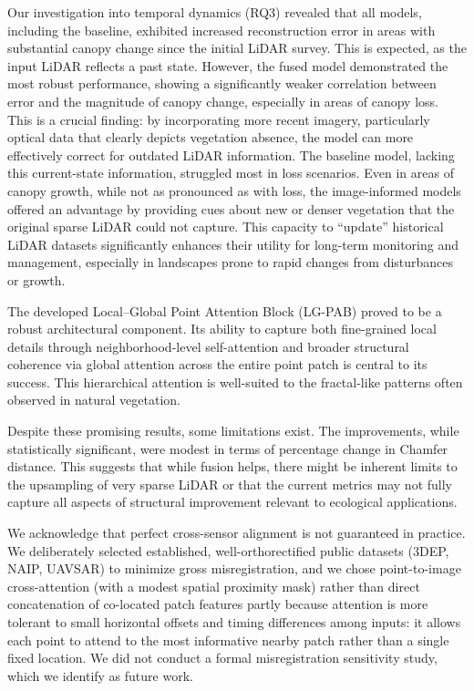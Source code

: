 \documentclass[12pt]{report}
\begin{document}
Our investigation into temporal dynamics (RQ3) revealed that all models, including the baseline, exhibited increased reconstruction error in areas with substantial canopy change since the initial LiDAR survey. This is expected, as the input LiDAR reflects a past state. However, the fused model demonstrated the most robust performance, showing a significantly weaker correlation between error and the magnitude of canopy change, especially in areas of canopy loss. This is a crucial finding: by incorporating more recent imagery, particularly optical data that clearly depicts vegetation absence, the model can more effectively correct for outdated LiDAR information. The baseline model, lacking this current-state information, struggled most in loss scenarios. Even in areas of canopy growth, while not as pronounced as with loss, the image-informed models offered an advantage by providing cues about new or denser vegetation that the original sparse LiDAR could not capture. This capacity to ``update'' historical LiDAR datasets significantly enhances their utility for long-term monitoring and management, especially in landscapes prone to rapid changes from disturbances or growth.

The developed Local--Global Point Attention Block (LG-PAB) proved to be a robust architectural component. Its ability to capture both fine-grained local details through neighborhood-level self-attention and broader structural coherence via global attention across the entire point patch is central to its success. This hierarchical attention is well-suited to the fractal-like patterns often observed in natural vegetation.

Despite these promising results, some limitations exist. The improvements, while statistically significant, were modest in terms of percentage change in Chamfer distance. This suggests that while fusion helps, there might be inherent limits to the upsampling of very sparse LiDAR or that the current metrics may not fully capture all aspects of structural improvement relevant to ecological applications.

We acknowledge that perfect cross-sensor alignment is not guaranteed in practice. We deliberately selected established, well-orthorectified public datasets (3DEP, NAIP, UAVSAR) to minimize gross misregistration, and we chose point-to-image cross-attention (with a modest spatial proximity mask) rather than direct concatenation of co-located patch features partly because attention is more tolerant to small horizontal offsets and timing differences among inputs: it allows each point to attend to the most informative nearby patch rather than a single fixed location. We did not conduct a formal misregistration sensitivity study, which we identify as future work.
\end{document}
